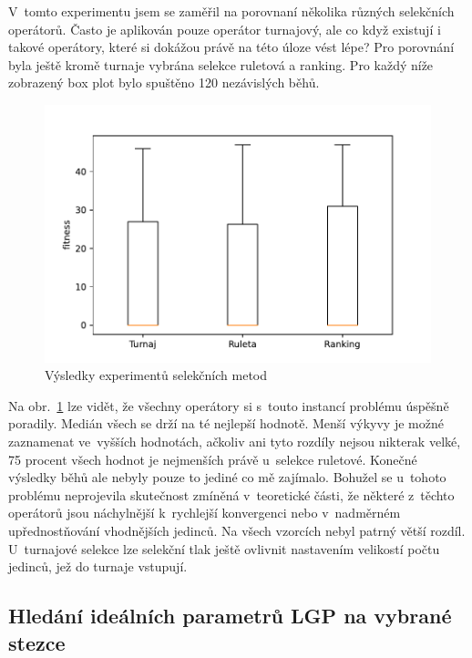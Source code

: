 V~tomto experimentu jsem se zaměřil na porovnaní několika různých selekčních operátorů. Často je aplikován pouze operátor turnajový, ale co když existují i takové operátory, které si dokážou právě na této úloze vést lépe? Pro porovnání byla ještě kromě turnaje vybrána selekce ruletová a ranking. Pro každý níže zobrazený box plot bylo spuštěno 120 nezávislých běhů.

\begin{figure}[!h]
    \centering
    \includegraphics[scale=0.8]{obrazky-figures/exp-lgp-selection-met-comp.pdf}
    \caption{Výsledky experimentů selekčních metod}
    \label{fig:exp-lgp-selection-met-comp}
\end{figure}

Na obr.~\ref{fig:exp-lgp-selection-met-comp} lze vidět, že všechny operátory si s~touto instancí problému úspěšně poradily. Medián všech se drží na té nejlepší hodnotě. Menší výkyvy je možné zaznamenat ve~vyšších hodnotách, ačkoliv ani tyto rozdíly nejsou nikterak velké, 75 procent všech hodnot je nejmenších právě u~selekce ruletové. 
Konečné výsledky běhů ale nebyly pouze to jediné co mě zajímalo. Bohužel se u~tohoto problému neprojevila skutečnost zmíněná v~teoretické části, že některé z~těchto operátorů jsou náchylnější k~rychlejší konvergenci nebo v~nadměrném upřednostňování vhodnějších jedinců. Na všech vzorcích nebyl patrný větší rozdíl. U~turnajové selekce lze selekční tlak ještě ovlivnit nastavením velikostí počtu jedinců, jež do turnaje vstupují.

\subsection{Hledání ideálních parametrů LGP na vybrané stezce}\label{subsection:1}


